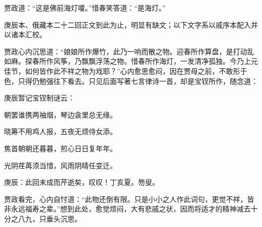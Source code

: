 \begin{parag}

    贾政道：“这是佛前海灯嗄。”惜春笑答道：“是海灯。”
\end{parag}

\begin{note}
    庚辰本、俄藏本二十二回正文到此为止，明显有缺文；以下文字系以戚序本配入并以诸本汇校。
\end{note}

\begin{parag}

    贾政心内沉思道：“娘娘所作爆竹，此乃一响而散之物。迎春所作算盘，是打动乱如麻。探春所作风筝，乃飘飘浮荡之物。惜春所作海灯，一发清净孤独。今乃上元佳节，如何皆作此不祥之物为戏耶？”心内愈思愈闷，因在贾母之前，不敢形于色，只得仍勉强往下看去。只见后面写著七言律诗一首，却是宝钗所作，随念道：
\end{parag}

\begin{poem}
    \begin{note} 庚辰暂记宝钗制谜云：\end{note}

    \begin{pl} 朝罢谁携两袖烟，琴边衾里总无缘。\end{pl}

    \begin{pl} 晓筹不用鸡人报，五夜无烦侍女添。\end{pl}

    \begin{pl} 焦首朝朝还暮暮，煎心日日复年年。\end{pl}

    \begin{pl} 光阴荏苒须当惜，风雨阴晴任变迁。\end{pl}
\end{poem}

\begin{parag}

    \begin{note}庚辰：此回未成而芹逝矣，叹叹！丁亥夏。笏叟。\end{note}
\end{parag}


\begin{parag}


    贾政看完，心内自忖道：“此物还倒有限。只是小小之人作此词句，更觉不祥，皆非永远福寿之辈。”想到此处，愈觉烦闷，大有悲戚之状，因而将适才的精神减去十分之八九，只垂头沉思。
\end{parag}


